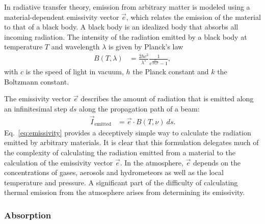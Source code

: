 In radiative transfer theory, emission from arbitrary matter is modeled using a
material-dependent emissivity vector $\vec{e}$, which relates the emission of
the material to that of a black body. A black body is an idealized body that
absorbs all incoming radiation. The intensity of the radiation emitted by a
black body at temperature $T$ and wavelength $\lambda$ is given by Planck's law
\begin{align}
B(T, \lambda) &= \frac{2 h c^2}{\lambda ^ 5}\frac{1}{e^{\frac{hc}{\lambda k_B T}} - 1},
\end{align} with $c$ is the speed of light in vacuum, $h$ the Planck
constant and $k$ the Boltzmann constant.

The emissivity vector $\vec{e}$ describes the amount of radiation that is
emitted along an infinitesimal step $ds$ along the propagation path of a beam: 
 \begin{align}
   \label{eq:emissivity}
   \vec{I}_\text{emitted} &= \vec{e} \cdot B(T, \nu)\ ds.
 \end{align}
 Eq.~\ref{eq:emissivity} provides a deceptively simple way to calculate the
 radiation emitted by arbitrary materials. It is clear that this formulation
 delegates much of the complexity of calculating the radiation emitted from a
 material to the calculation of the emissivity vector $\vec{e}$. In the
 atmosphere, $\vec{e}$ depends on the concentrations of gases, aerosols and
 hydrometeors as well as the local temperature and pressure. A significant part
 of the difficulty of calculating thermal emission from the atmosphere arises
 from determining its emissivity.




\subsubsection{Absorption}

